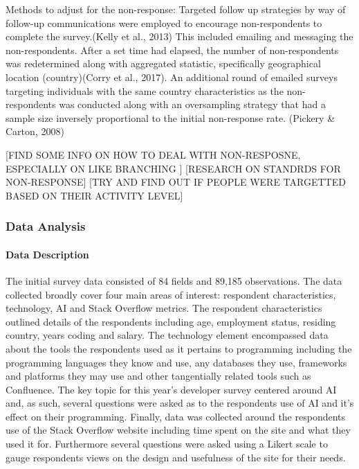 \documentclass[
  12pt,
]{article}
\begin{document}
Methods to adjust for the non-response: Targeted follow up strategies by
way of follow-up communications were employed to encourage
non-respondents to complete the survey.(Kelly et al., 2013) This
included emailing and messaging the non-respondents. After a set time
had elapsed, the number of non-respondents was redetermined along with
aggregated statistic, specifically geographical location (country)(Corry
et al., 2017). An additional round of emailed surveys targeting
individuals with the same country characteristics as the non-respondents
was conducted along with an oversampling strategy that had a sample size
inversely proportional to the initial non-response rate. (Pickery \&
Carton, 2008)

{[}FIND SOME INFO ON HOW TO DEAL WITH NON-RESPOSNE, ESPECIALLY ON LIKE
BRANCHING {]} {[}RESEARCH ON STANDRDS FOR NON-RESPONSE{]} {[}TRY AND
FIND OUT IF PEOPLE WERE TARGETTED BASED ON THEIR ACTIVITY LEVEL{]}

\hypertarget{data-analysis}{%
\subsubsection{Data Analysis}\label{data-analysis}}

\hypertarget{data-description-1}{%
\paragraph{Data Description}\label{data-description-1}}

The initial survey data consisted of 84 fields and 89,185 observations.
The data collected broadly cover four main areas of interest: respondent
characteristics, technology, AI and Stack Overflow metrics. The
respondent characteristics outlined details of the respondents including
age, employment status, residing country, years coding and salary. The
technology element encompassed data about the tools the respondents used
as it pertains to programming including the programming languages they
know and use, any databases they use, frameworks and platforms they may
use and other tangentially related tools such as Confluence. The key
topic for this year's developer survey centered around AI and, as such,
several questions were asked as to the respondents use of AI and it's
effect on their programming. Finally, data was collected around the
respondents use of the Stack Overflow website including time spent on
the site and what they used it for. Furthermore several questions were
asked using a Likert scale to gauge respondents views on the design and
usefulness of the site for their needs.
\end{document}
